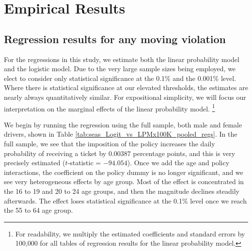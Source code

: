 \section{Empirical Results}
\label{sec:Empirical}


\subsection{Regression results for any moving violation}
\label{sec:Empirical_all}

For the regressions in this study, we estimate both the linear probability model and the logistic model. 
%
Due to the very large sample sizes being employed, 
we elect to consider only statistical significance at the 0.1\% and the 0.001\% level. 
%
Where there is statistical significance at our elevated thresholds, 
the estimates are nearly always quantitatively similar. 
For expositional simplicity, we will focus our interpretation on 
the marginal effects of the linear probability model.%
\footnote{%
For readability, we multiply the estimated coefficients and standard errors by 100,000 
for all tables of regression results for the linear probability model.
}






We begin by running the regression using the full sample, 
both male and female drivers, 
shown in 
Table \ref{tab:seas_Logit_vs_LPMx100K_pooled_regs}.
% 
In the full sample, we see that the imposition of the policy increases the daily probability 
of receiving a ticket by $0.00387$ percentage points, 
and this is very precisely estimated ($t$-statistic = $-94.054$). 
Once we add the age and policy interactions, 
the coefficient on the policy dummy is no longer significant, 
and we see very heterogeneous effects by age group. 
Most of the effect is concentrated in the 16 to 19 and 20 to 24 age groups, 
and then the magnitude declines steadily afterwards. 
The effect loses statistical significance at the 0.1\% level once we reach the 55 to 64 age group.

